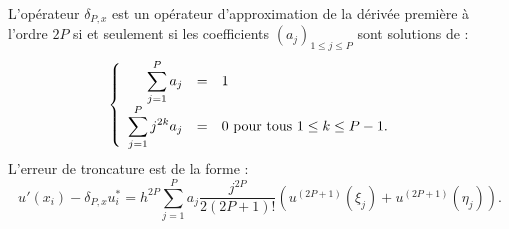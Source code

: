 \begin{theoreme}
L'opérateur $\delta_{P,x}$ est un opérateur d'approximation de la dérivée première à l'ordre $2P$ si et seulement si les coefficients $(a_j)_{1 \leq j \leq P}$ sont solutions de :
\begin{equation}
\left\lbrace
\begin{array}{rcll}
\displaystyle\sum\limits_{j=1}^P a_j & = & 1 & \\
\displaystyle\sum\limits_{j=1}^P j^{2k} a_j & = & 0 \text{ pour tous } 1 \leq k \leq P-1.
\end{array}
\right.
\end{equation}
L'erreur de troncature est de la forme :
\begin{equation}
u'(x_i) - \delta_{P,x} u^*_i = h^{2P}\sum_{j=1}^P a_j \dfrac{j^{2P}}{2(2P+1)!} \left( u^{(2P+1)}(\xi_j) + u^{(2P+1)}(\eta_j) \right).
\end{equation}
\label{th:consistance_delta_x_explicite}
\end{theoreme}

